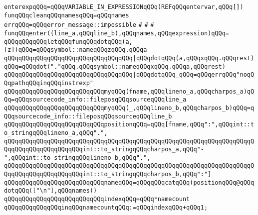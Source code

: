 \newline
\newline
\verb|enterexpqQQq=qQQqVARIABLE_IN_EXPRESSIONqQQq(REFqQQqentervar,qQQq[])|\newline
\newline
\verb|funqQQqcleanqQQqnamesqQQq=qQQqnames|\newline
\verb|errqQQq=qQQqerror_message::impossible|\newline
\newline
\newline
\verb|#|\newline
\verb|#|\newline
\verb|#|\newline
\verb|funqQQqenter((line_a,qQQqline_b),qQQqnames,qQQqexpression)qQQq=|\newline
\verb|qQQqqQQqqQQqletqQQqfunqQQqdotqQQq(a,[z])qQQq=qQQqsymbol::nameqQQqzqQQq.qQQqa|\newline
\verb|qQQqqQQqqQQqqQQqqQQqqQQqqQQqqQQqqQQq|\verb#|qQQqdotqQQq(a,qQQqxqQQq.qQQqrest)qQQq=qQQqdot("."qQQq.qQQqsymbol::nameqQQqxqQQq.qQQqa,qQQqrest)#\newline
\verb|qQQqqQQqqQQqqQQqqQQqqQQqqQQqqQQqqQQq|\verb#|qQQqdotqQQq_qQQq=qQQqerrqQQq"noqQQqpathqQQqinqQQqinstrexp"#\newline
\verb|qQQqqQQqqQQqqQQqqQQqqQQqqQQqmyqQQq(fname,qQQqlineno_a,qQQqcharpos_a)qQQq=qQQqsourcecode_info::fileposqQQqsourceqQQqline_a|\newline
\verb|qQQqqQQqqQQqqQQqqQQqqQQqqQQqmyqQQq(_,qQQqlineno_b,qQQqcharpos_b)qQQq=qQQqsourcecode_info::fileposqQQqsourceqQQqline_b|\newline
\verb|qQQqqQQqqQQqqQQqqQQqqQQqqQQqpositionqQQq=qQQq[fname,qQQq":",qQQqint::to_stringqQQqlineno_a,qQQq".",|\newline
\verb|qQQqqQQqqQQqqQQqqQQqqQQqqQQqqQQqqQQqqQQqqQQqqQQqqQQqqQQqqQQqqQQqqQQqqQQqqQQqqQQqqQQqqQQqqQQqint::to_stringqQQqcharpos_a,qQQq"-",qQQqint::to_stringqQQqlineno_b,qQQq".",|\newline
\verb|qQQqqQQqqQQqqQQqqQQqqQQqqQQqqQQqqQQqqQQqqQQqqQQqqQQqqQQqqQQqqQQqqQQqqQQqqQQqqQQqqQQqqQQqqQQqint::to_stringqQQqcharpos_b,qQQq":"]|\newline
\verb|qQQqqQQqqQQqqQQqqQQqqQQqqQQqnameqQQq=qQQqqQQqcatqQQq(positionqQQq@qQQqdotqQQq(["\n"],qQQqnames))|\newline
\verb|qQQqqQQqqQQqqQQqqQQqqQQqqQQqindexqQQq=qQQq*namecount|\newline
\verb|qQQqqQQqqQQqqQQqinqQQqnamecountqQQq:=qQQqindexqQQq+qQQq1;|\newline
